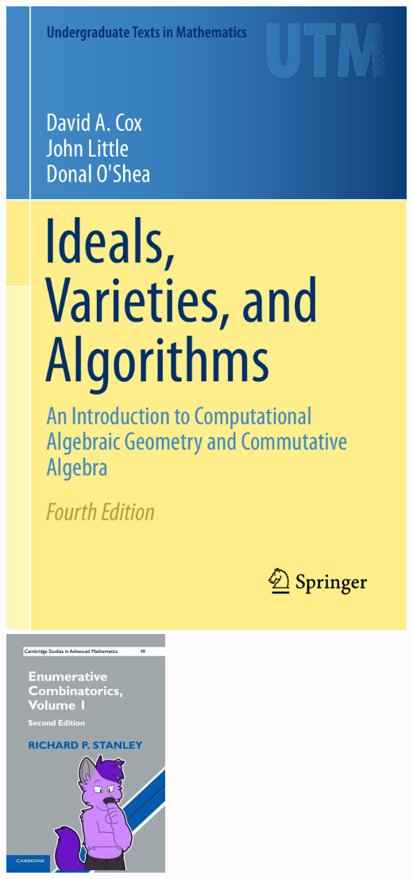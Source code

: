 \documentclass{ctexbeamer}
\begin{document}
\begin{frame}
  \includegraphics[scale=0.2]{AG.pdf}
  \includegraphics[scale=0.45]{EC.jpeg}

\end{frame}
\end{document}
